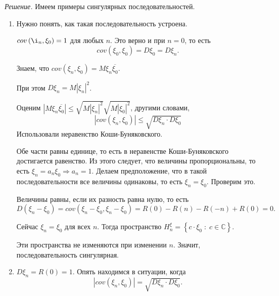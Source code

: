 \textit{Решение.}
Имеем примеры сингулярных последовательностей.

\begin{enumerate}[label=\alph*)]
  \item Нужно понять, как такая последовательность устроена.

  $cov \left( \i_n, \xi_0 \right) = 1$ для любых $n$.
  Это верно и при $n = 0$, то есть
  \begin{equation*}
    cov \left( \xi_0, \xi_0 \right) =
    D \xi_0 =
    D \xi_n.
  \end{equation*}

  Знаем, что $cov \left( \xi_n, \xi_0 \right) = M \xi_n \overline{ \xi_0}$.

  При этом $D \xi_n = M \left| \xi_n \right|^2$.

  Оценим
  $ \left| M \xi_n \overline{ \xi_0} \right| \leq
    \sqrt{M \left| \xi_n \right|^2} \sqrt{M \left| \xi_0 \right|^2}$,
  другими словами,
  \begin{equation*}
    \left| cov \left( \xi_n, \xi_0 \right) \right| \leq
    \sqrt{D \xi_n \cdot D \xi_0}
  \end{equation*}
  Использовали неравенство Коши-Буняковского.

  Обе части равны единице, то есть в неравенстве Коши-Буняковского достигается равенство.
  Из этого следует, что величины пропорциональны, то есть $ \xi_n = a_n \xi_0 \Rightarrow a_n = 1$.
  Делаем предположение, что в такой последовательности все величины одинаковы,
  то есть $ \xi_n = \xi_0$.
  Проверим это.

  Величины равны, если их разность равна нулю, то есть
  \begin{equation*}
    D \left( \xi_n - \xi_0 \right) =
    cov \left( \xi_n - \xi_0, \xi_n - \xi_0 \right) =
    R \left( 0 \right) - R \left( n \right) - R \left( -n \right) + R \left( 0 \right) =
    0.
  \end{equation*}

  Сейчас $ \xi_n = \xi_0$ для всех $n$.
  Тогда пространство $H_n^{ \xi } = \left\{ c \cdot \xi_0 \; : \; c \in \mathbb{C} \right\} $.

  Эти пространства не изменяются при изменении $n$.
  Значит, последовательность сингулярная.
  \item $D \xi_n = R \left( 0 \right) = 1$.
  Опять находимся в ситуации, когда
  \begin{equation*}
    \left| cov \left( \xi_n, \xi_0 \right) \right| =
    \sqrt{D \xi_n \cdot D \xi_0}.
  \end{equation*}


\end{enumerate}
